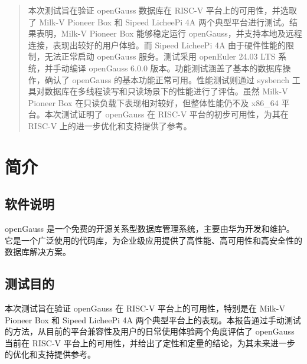 \documentclass{article}
\begin{document}
\maketitle

\begin{abstract}
本次测试旨在验证 openGauss 数据库在 RISC-V 平台上的可用性，并选取了 Milk-V Pioneer Box 和 Sipeed LicheePi 4A 两个典型平台进行测试。结果表明，Milk-V Pioneer Box 能够稳定运行 openGauss，并支持本地及远程连接，表现出较好的用户体验。而 Sipeed LicheePi 4A 由于硬件性能的限制，无法正常启动 openGauss 服务。测试采用 openEuler 24.03 LTS 系统，并手动编译 openGauss 6.0.0 版本。功能测试涵盖了基本的数据库操作，确认了 openGauss 的基本功能正常可用。性能测试则通过 sysbench 工具对数据库在多线程读写和只读场景下的性能进行了评估。虽然 Milk-V Pioneer Box 在只读负载下表现相对较好，但整体性能仍不及 x86\_64 平台。本次测试证明了 openGauss 在 RISC-V 平台的初步可用性，为其在 RISC-V 上的进一步优化和支持提供了参考。
\end{abstract}

\thispagestyle{empty} %

\newpage
\tableofcontents

\newpage

\section{简介}

\subsection{软件说明}
openGauss 是一个免费的开源关系型数据库管理系统，主要由华为开发和维护。它是一个广泛使用的代码库，为企业级应用提供了高性能、高可用性和高安全性的数据库解决方案。

\subsection{测试目的}
本次测试旨在验证 openGauss 在 RISC-V 平台上的可用性，特别是在 Milk-V Pioneer Box 和 Sipeed LicheePi 4A 两个典型平台上的表现。本报告通过手动测试的方法，从目前的平台兼容性及用户的日常使用体验两个角度评估了 openGauss 当前在 RISC-V 平台上的可用性，并给出了定性和定量的结论，为其未来进一步的优化和支持提供参考。
\end{document}
